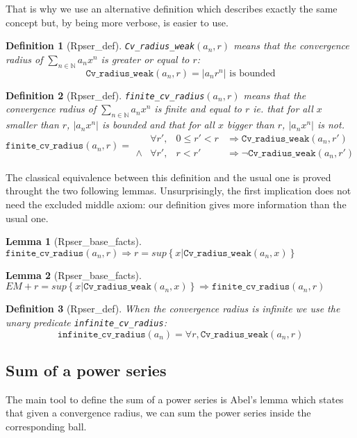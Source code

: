 \documentclass[submission,copyright]{eptcs}
\newcommand{\N}{\mathbb{N}}
\newcommand{\cvrw}{\texttt{Cv\_radius\_weak}}
\newcommand{\fcvr}{\texttt{finite\_cv\_radius}}
\newcommand{\icvr}{\texttt{infinite\_cv\_radius}}
\newtheorem{definition}{Definition}
\newtheorem{lemma}{Lemma}
\begin{document}
That is why we use an alternative definition which describes exactly the same
concept but, by being more verbose, is easier to use.

\begin{definition}[Rpser\_def] \cvrw{}$(a_n,r)$ means that the convergence
radius of $\sum_{n \in \N} a_n x^n$ is greater or equal to $r$:
$$\cvrw{}(a_n,r) = \left| a_n r^n \right| \text{ is bounded}$$
\end{definition}

\begin{definition}[Rpser\_def]\fcvr{}$(a_n,r)$ means that the
convergence radius of $\sum_{n \in \N} a_n x^n$ is finite and equal to $r$ ie.
that for all $x$ smaller than $r$, $\left|a_n x^n\right|$ is bounded and
that for all $x$ bigger than $r$,  $\left|a_n x^n\right|$ is not.
$$\fcvr{}(a_n,r) =
\begin{array}{clcl}
        & \forall r', & 0 \le r' < r & \Rightarrow \cvrw{}(a_n,r') \\
 \wedge & \forall r', & r < r' & \Rightarrow \neg \cvrw{}(a_n,r')
\end{array}$$
\end{definition}

The classical equivalence between this definition and the usual one is proved
throught the two following lemmas. Unsurprisingly, the first implication does
not need the excluded middle axiom: our definition gives more information than
the usual one.

\begin{lemma}[Rpser\_base\_facts] $\fcvr{}(a_n,r) \Rightarrow r = sup \left\lbrace x |
\cvrw{}(a_n, x) \right\rbrace$ \end{lemma}

\begin{lemma}[Rpser\_base\_facts] $EM + r = sup \left\lbrace x |
\cvrw{}(a_n, x) \right\rbrace \Rightarrow \fcvr{}(a_n,r)$ \end{lemma}

\begin{definition}[Rpser\_def] When the convergence radius is infinite we use
the unary predicate \icvr{}: $$\icvr{}(a_n) = \forall r, \cvrw{}(a_n,r)$$
\end{definition}

\subsection{Sum of a power series}

The main tool to define the sum of a power series is Abel's lemma which states
that given a convergence radius, we can sum the power series inside the
corresponding ball.
\end{document}

